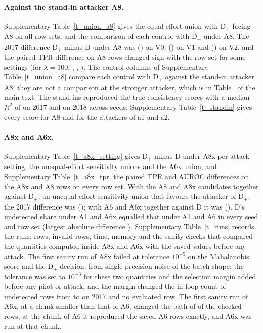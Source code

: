 \paragraph{Against the stand-in attacker A8.}
Supplementary Table~\ref{t_union_a8} gives the equal-effort union with D$_+$ facing A8 on all row sets, and the
comparison of each control with D$_+$ under A8.
The 2017 difference D$_+$ minus D under A8 was \axStandinVzeroSeventeen{} (\axStandinVzeroSeventeenCI) on V0,
\axStandinVoneSeventeen{} (\axStandinVoneSeventeenCI) on V1 and \axStandinVtwoSeventeen{} (\axStandinVtwoSeventeenCI)
on V2, and the paired TPR difference on A8 rows changed sign with the row set for some settings (for $\lambda = 100$:
\tprAeightHundredVzeroSeventeen, \tprAeightHundredVoneSeventeen, \tprAeightHundredVtwoSeventeen).
The control columns of Supplementary Table~\ref{t_union_a8} compare each control with D$_+$ against the stand-in
attacker A8; they are not a comparison at the stronger attacker, which is in Table~\mainTabUnion{} of the main text.
The stand-ins reproduced the true consistency scores with a median $R^2$ of \standinMedSeventeenRange{} on 2017 and
\standinMedEighteenRange{} on 2018 across seeds; Supplementary Table~\ref{t_standin} gives every score for A8 and for
the attackers of a1 and a2.

\paragraph{A8x and A6x.}
Supplementary Table~\ref{t_a8x_setting} gives D$_+$ minus D under A8x per attack setting, the unequal-effort
sensitivity unions and the A6x union, and Supplementary Table~\ref{t_a8x_tpr} the paired TPR and AUROC differences on
the A8x and A8 rows on every row set.
With the A8 and A8x candidates together against D$_+$, an unequal-effort sensitivity union that favours the attacker of
D$_+$, the 2017 difference was \axSensVoneSeventeen{} (\axSensVoneSeventeenCI); with A6 and A6x together against D it
was \sxSensVoneSeventeen{} (\sxSensVoneSeventeenCI).
D's undetected share under A1 and A6x equalled that under A1 and A6 in every seed and row set (largest absolute
difference \sxSelMaxAbs).
Supplementary Table~\ref{t_runs} records the runs: rows, invalid rows, time, memory and the sanity checks that compared
the quantities computed inside A8x and A6x with the saved values before any attack.
The first sanity run of A8x failed at tolerance $10^{-5}$ on the Mahalanobis score and the D$_+$ decision, from
single-precision noise of the batch shape; the tolerance was set to $10^{-3}$ for these two quantities and the
\axMargin{} selection margin added before any pilot or attack, and the margin changed the in-loop count of
undetected rows from \axInloopNoMarginSeventeen{} to \axInloopMarginSeventeen{} on 2017 and no evaluated row.
The first sanity run of A6x, at a chunk smaller than that of A6, changed the path of \sxRunoneRows{} of the checked rows;
at the chunk of A6 it reproduced the saved A6 rows exactly, and A6x was run at that chunk.

